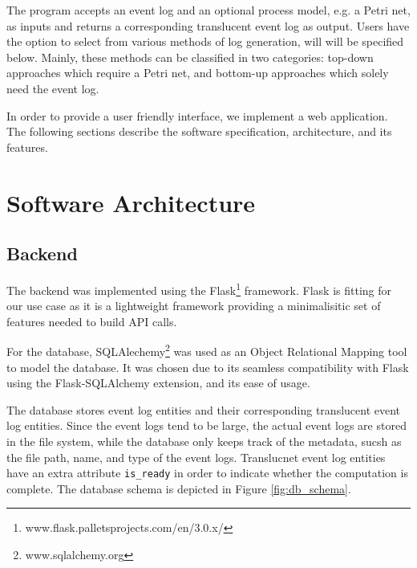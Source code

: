 


The program accepts an event log and an optional process model, e.g. a Petri net, as inputs and returns a corresponding translucent event log as output. Users have the option to select from various methods of log generation, will will be specified below. Mainly, these methods can be classified in two categories: top-down approaches which require a Petri net, and bottom-up approaches which solely need the event log.

In order to provide a user friendly interface, we implement a web application. The following sections describe the software specification, architecture, and its features.

\section{Software Architecture}

\subsection{Backend}

The backend was implemented using the Flask\footnote{www.flask.palletsprojects.com/en/3.0.x/} framework. Flask is fitting for our use case as it is a lightweight framework providing a minimalisitic set of features needed to build API calls.

For the database, SQLAlechemy\footnote{www.sqlalchemy.org} was used as an Object Relational Mapping tool to model the database. It was chosen due to its seamless compatibility with Flask using the Flask-SQLAlchemy extension, and its ease of usage.

The database stores event log entities and their corresponding translucent event log entities. Since the event logs tend to be large, the actual event logs are stored in the file system, while the database only keeps track of the metadata, sucsh as the file path, name, and type of the event logs. Translucnet event log entities have an extra attribute \texttt{is\_ready} in order to indicate whether the computation is complete. The database schema is depicted in Figure \ref{fig:db_schema}.

